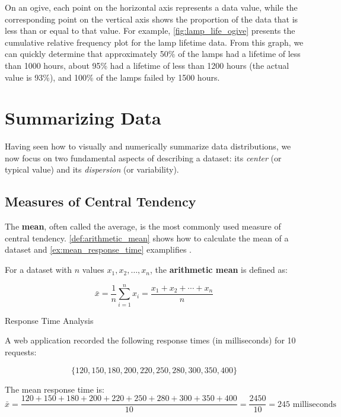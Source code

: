 On an ogive, each point on the horizontal axis represents a data value, while the corresponding point on the vertical axis shows the proportion of the data that is less than or equal to that value. For example, \autoref{fig:lamp_life_ogive} presents the cumulative relative frequency plot for the lamp lifetime data. From this graph, we can quickly determine that approximately 50\% of the lamps had a lifetime of less than 1000 hours, about 95\% had a lifetime of less than 1200 hours (the actual value is 93\%), and 100\% of the lamps failed by 1500 hours.

\section{Summarizing Data}
Having seen how to visually and numerically summarize data distributions, we now focus on two fundamental aspects of describing a dataset: its \emph{center} (or typical value) and its \emph{dispersion} (or variability).

\subsection*{Measures of Central Tendency}
The \textbf{mean}, often called the average, is the most commonly used measure of central tendency. \autoref{def:arithmetic_mean} shows how to calculate the mean of a dataset and \autoref{ex:mean_response_time} examplifies .

\begin{definition} \label{def:arithmetic_mean}

For a dataset with $n$ values $x_1, x_2, \ldots, x_n$, the \textbf{arithmetic mean} is defined as:

$$
\bar{x} = \frac{1}{n}\sum_{i=1}^{n} x_i = \frac{x_1 + x_2 + \cdots + x_n}{n}
$$

\end{definition}


\begin{example} Response Time Analysis \label{ex:mean_response_time}

A web application recorded the following response times (in milliseconds) for 10 requests:

\[
\{120, 150, 180, 200, 220, 250, 280, 300, 350, 400\}
\]

The mean response time is:
\[
\bar{x} = \frac{120 + 150 + 180 + 200 + 220 + 250 + 280 + 300 + 350 + 400}{10} = \frac{2450}{10} = 245 \text{ milliseconds}
\]
\end{example}

